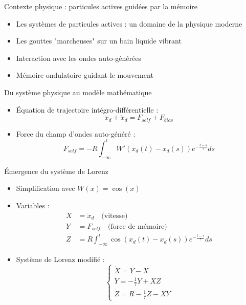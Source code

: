 
\begin{frame}{Contexte physique : particules actives guidées par la mémoire}
    \begin{itemize}
        \item Les systèmes de particules actives : un domaine de la physique moderne
        \item Les gouttes "marcheuses" sur un bain liquide vibrant
        \item Interaction avec les ondes auto-générées
        \item Mémoire ondulatoire guidant le mouvement
    \end{itemize}
\end{frame}

\begin{frame}{Du système physique au modèle mathématique}
    \begin{itemize}
        \item Équation de trajectoire intégro-différentielle :
        \begin{equation}
            \ddot{x}_d + \dot{x}_d = F_{self} + F_{bias}
        \end{equation}
        \item Force du champ d'ondes auto-généré :
        \begin{equation}
            F_{self} = -R\int_{-\infty}^t W'(x_d(t)-x_d(s)) e^{-\frac{t-s}{\tau}} ds
        \end{equation}
    \end{itemize}
\end{frame}

\begin{frame}{Émergence du système de Lorenz}
    \begin{itemize}
        \item Simplification avec $W(x) = \cos(x)$
        \item Variables :
        \begin{align*}
            X &= \dot{x}_d \quad \text{(vitesse)} \\
            Y &= F_{self} \quad \text{(force de mémoire)} \\
            Z &= R\int_{-\infty}^t \cos(x_d(t)-x_d(s)) e^{-\frac{t-s}{\tau}} ds
        \end{align*}
        \item Système de Lorenz modifié :
        \begin{equation*}
        \begin{cases}
            \dot{X} = Y - X \\
            \dot{Y} = -\frac{1}{\tau} Y + XZ \\
            \dot{Z} = R - \frac{1}{\tau} Z - XY
        \end{cases}
        \end{equation*}
    \end{itemize}
\end{frame}

